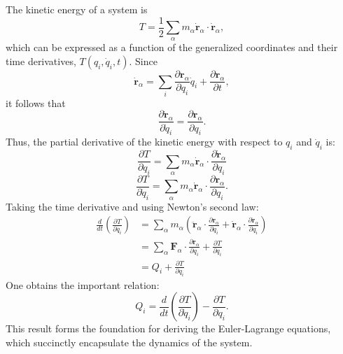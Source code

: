 The kinetic energy of a system is
\begin{equation}
    T = \frac{1}{2}\sum_\alpha m_\alpha \dot{\mathbf{r}}_\alpha \cdot \dot{\mathbf{r}}_\alpha,
\end{equation}
which can be expressed as a function of the generalized coordinates and their time derivatives, \(T(q_i,\dot{q}_i,t)\). Since
\begin{equation}
    \dot{\mathbf{r}}_\alpha = \sum_i \frac{\partial \mathbf{r}_\alpha}{\partial q_i}\dot{q}_i + \frac{\partial \mathbf{r}_\alpha}{\partial t},
\end{equation}
it follows that
\begin{equation}
    \frac{\partial \dot{\mathbf{r}}_\alpha}{\partial \dot{q}_i} = \frac{\partial \mathbf{r}_\alpha}{\partial q_i}.
\end{equation}
Thus, the partial derivative of the kinetic energy with respect to \(q_i\) and \(\dot{q}_i\) is:
\begin{equation}
    \frac {\partial T}{\partial q_i}  = \sum_\alpha m_\alpha \dot{\mathbf{r}}_\alpha \cdot \frac{\partial \dot{\mathbf{r}}_\alpha}{\partial q_i}
\end{equation}
\begin{equation}
    \frac{\partial T}{\partial \dot{q}_i} = \sum_\alpha m_\alpha \dot{\mathbf{r}}_\alpha \cdot \frac{\partial \mathbf{r}_\alpha}{\partial q_i}.
\end{equation}
Taking the time derivative and using Newton's second law:
\begin{align}
    \frac{d}{dt} \left(\frac {\partial T}{\partial \dot{q_i}}\right) & = \sum_\alpha m_\alpha \left(\ddot{\mathbf{r}}_\alpha \cdot \frac{\partial \mathbf{r}_\alpha}{\partial q_i} + \dot{\mathbf{r}}_\alpha \cdot \frac{\partial \dot{\mathbf{r}}_\alpha}{\partial q_i}\right) \\
                                                                     & = \sum_\alpha \mathbf{F}_\alpha \cdot \frac{\partial \mathbf{r}_\alpha}{\partial q_i} + \frac{\partial T}{\partial q_i} \\
                                                                     & = Q_i + \frac{\partial T}{\partial q_i}  
\end{align}
One obtains the important relation:
\begin{equation}
    Q_i = \frac{d}{dt}\left(\frac{\partial T}{\partial \dot{q}_i}\right) - \frac{\partial T}{\partial q_i}.
\end{equation}
This result forms the foundation for deriving the Euler-Lagrange equations, which succinctly encapsulate the dynamics of the system.

